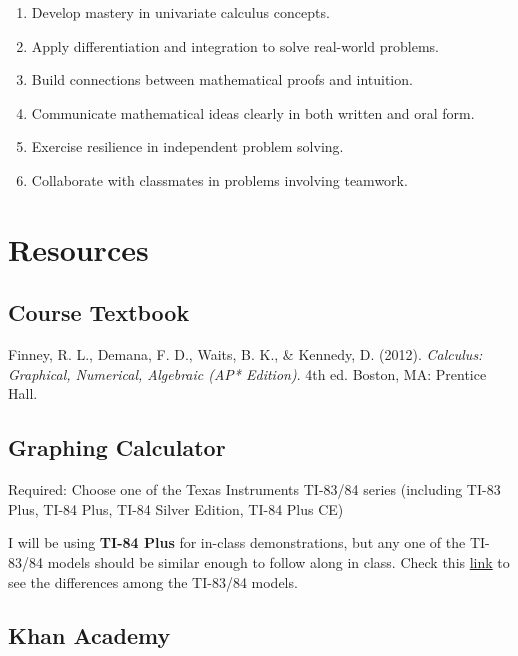 \documentclass[12pt,fleqn]{article}
\providecommand{\tightlist}{%
  \setlength{\itemsep}{0pt}\setlength{\parskip}{0pt}}
\begin{document}
\begin{enumerate}
\def\labelenumi{\arabic{enumi}.}
\tightlist
\item
  Develop mastery in univariate calculus concepts.
\item
  Apply differentiation and integration to solve real-world problems.
\item
  Build connections between mathematical proofs and intuition.
\item
  Communicate mathematical ideas clearly in both written and oral form.
\item
  Exercise resilience in independent problem solving.
\item
  Collaborate with classmates in problems involving teamwork.
\end{enumerate}

\hypertarget{resources}{%
\section{Resources}\label{resources}}

\hypertarget{course-textbook}{%
\subsection{Course Textbook}\label{course-textbook}}

Finney, R. L., Demana, F. D., Waits, B. K., \& Kennedy, D. (2012).
\emph{Calculus: Graphical, Numerical, Algebraic (AP* Edition)}. 4th ed.
Boston, MA: Prentice Hall.

\hypertarget{graphing-calculator}{%
\subsection{Graphing Calculator}\label{graphing-calculator}}

Required: Choose one of the Texas Instruments TI-83/84 series (including TI-83 Plus, TI-84 Plus, TI-84 Silver Edition, TI-84 Plus CE)

I will be using \textbf{TI-84 Plus} for in-class demonstrations, but any one of the TI-83/84 models should be similar enough to follow along in class. Check this \href{https://brownmath.com/ti83/diff8384.htm\#PlusSilver}{link} to see the differences among the TI-83/84 models.

\hypertarget{khan}{%
\subsection{Khan Academy}\label{khan}}
\end{document}
